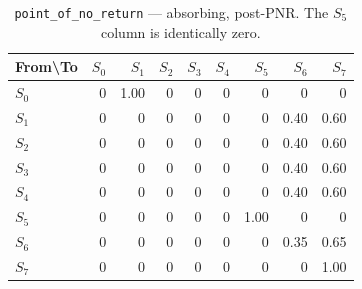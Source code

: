 \documentclass[11pt,a4paper]{article}
\begin{document}
\begin{table}[H]
\centering
\caption{\texttt{point\_of\_no\_return} --- absorbing, post-PNR. The $S_5$
column is identically zero.}
\begin{tabular}{lrrrrrrrr}
\toprule
From\textbackslash To & $S_0$ & $S_1$ & $S_2$ & $S_3$ & $S_4$ & $S_5$ & $S_6$ & $S_7$ \\
\midrule
$S_0$ & 0 & 1.00 & 0 & 0 & 0 & 0 & 0 & 0 \\
$S_1$ & 0 & 0 & 0 & 0 & 0 & 0 & 0.40 & 0.60 \\
$S_2$ & 0 & 0 & 0 & 0 & 0 & 0 & 0.40 & 0.60 \\
$S_3$ & 0 & 0 & 0 & 0 & 0 & 0 & 0.40 & 0.60 \\
$S_4$ & 0 & 0 & 0 & 0 & 0 & 0 & 0.40 & 0.60 \\
$S_5$ & 0 & 0 & 0 & 0 & 0 & 1.00 & 0 & 0 \\
$S_6$ & 0 & 0 & 0 & 0 & 0 & 0 & 0.35 & 0.65 \\
$S_7$ & 0 & 0 & 0 & 0 & 0 & 0 & 0 & 1.00 \\
\bottomrule
\end{tabular}
\end{table}
\end{document}
